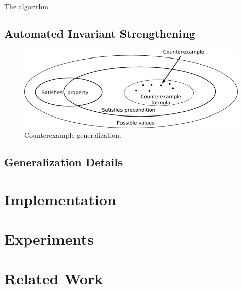 \documentclass[10pt]{sigplanconf}
\begin{document}
The algorithm 




\subsection{Automated Invariant Strengthening}

\begin{figure}[ht!]
  \begin{center}
    \includegraphics[scale=0.5]{Figs/cex-gen}
   \end{center}
  \caption{Counterexample generalization.}
  \label{fig:cex-gen}
\end{figure}


\subsection{Generalization Details}


\section{Implementation}\label{sec:implementation}



\section{Experiments}




\section{Related Work}
\label{sec:related}
\end{document}
